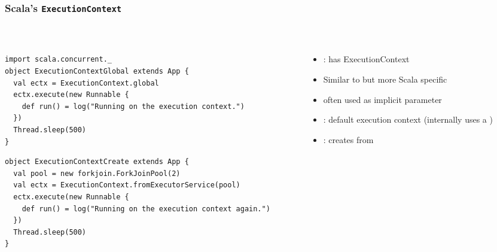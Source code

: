 \documentclass[aspectratio=169]{beamer}
\begin{document}
\begin{frame}[fragile]\frametitle{Scala's \texttt{ExecutionContext}}
~\\[-6mm]
\begin{columns}
\begin{column}{0.74\textwidth}
\begin{lstlisting}[emph={execute,sleep,log,global}]
import scala.concurrent._
object ExecutionContextGlobal extends App {
  val ectx = ExecutionContext.global
  ectx.execute(new Runnable {
    def run() = log("Running on the execution context.")
  })
  Thread.sleep(500)
}
\end{lstlisting}
\begin{lstlisting}[emph={execute,sleep,log,global,fromExecutorService}]
object ExecutionContextCreate extends App {
  val pool = new forkjoin.ForkJoinPool(2)
  val ectx = ExecutionContext.fromExecutorService(pool)
  ectx.execute(new Runnable {
    def run() = log("Running on the execution context again.")
  })
  Thread.sleep(500)
}
\end{lstlisting}
\end{column}
\begin{column}{0.36\textwidth}
\begin{itemize}
  \item {}: has \alert{ExecutionContext}
  \item Similar to  but more Scala specific
  \item often used as implicit parameter
  \item \alert{}: default execution context (internally uses a )
  \item {}: creates  from 
\end{itemize}
\end{column}
\end{columns}
\end{frame}
\end{document}
